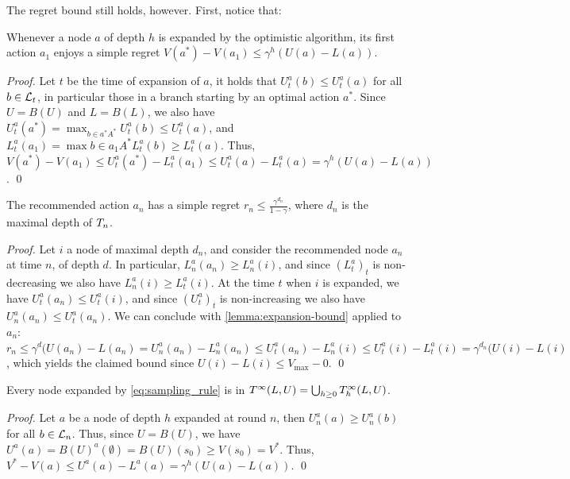 \documentclass[runningheads]{llncs}
\begin{document}
The regret bound still holds, however. First, notice that:
\begin{lemma}
\label{lemma:expansion-bound}
Whenever a node $a$ of depth $h$ is expanded by the optimistic algorithm, its first action $a_1$ enjoys a simple regret $V(a^*)-V(a_1) \leq \gamma^h(U(a)-L(a))$. 
\end{lemma}
\begin{proof}
Let $t$ be the time of expansion of $a$, it holds that $U^a_t(b) \leq U^a_t(a)$ for all $b\in \mathcal{L}_t$, in particular those in a branch starting by an optimal action $a^*$. Since $U=B(U)$ and $L=B(L)$, we also have $U^a_t(a^*) = \max_{b\in a^*A^*} U^a_t(b) \leq U^a_t(a)$, and $L^a_t(a_1) = \max{b\in a_1 A^*} L^a_t(b) \geq  L^a_t(a)$. Thus, $V(a^*)-V(a_1) \leq U^a_t(a^*) - L^a_t(a_1) \leq U^a_t(a) - L^a_t(a) = \gamma^h(U(a)-L(a))$.
\qed\end{proof}
 
\begin{lemma}
The recommended action $a_n$ has a simple regret $r_n \leq \frac{\gamma^{d_n}}{1-\gamma}$, where $d_n$ is the maximal depth of $T_n$.
\end{lemma}
\begin{proof}
Let $i$ a node of maximal depth $d_n$, and consider the recommended node $a_n$ at time $n$, of depth $d$. In particular, $L^a_n(a_n) \geq L^a_n(i)$, and since $(L^a_t)_t$ is non-decreasing we also have $L^a_n(i) \geq L^a_t(i)$. At the time $t$ when $i$ is expanded, we have $U^a_t(a_n) \leq U^a_t(i)$, and since $(U^a_t)_t$ is non-increasing we also have $U^a_n(a_n) \leq U^a_t(a_n)$. We can conclude with \autoref{lemma:expansion-bound} applied to $a_n$: $r_n \leq \gamma^d(U(a_n)-L(a_n) = U^a_n(a_n) - L^a_n(a_n)  \leq U^a_t(a_n) - L^a_n(i) \leq U^a_t(i) - L^a_t(i) = \gamma^{d_n}(U(i) - L(i)$, which yields the claimed bound since $U(i) - L(i) \leq V_{\max}-0$.
\qed\end{proof}

\begin{lemma}
\label{lemma:expansion-tree}
Every node expanded by \eqref{eq:sampling_rule} is in $T^\infty(L,U) = \bigcup_{h\geq 0} T^\infty_h(L,U)$.
\end{lemma}
\begin{proof}
Let $a$ be a node of depth $h$ expanded at round $n$, then $U^a_n(a) \geq U^a_n(b)$ for all $b\in\mathcal{L}_n$. Thus, since $U = B(U)$, we have $U^a(a) = B(U)^a(\emptyset) = B(U)(s_0) \geq V(s_0) = V^*$. Thus, $V^* - V(a) \leq U^a(a) - L^a(a) = \gamma^h(U(a) - L(a))$.
\qed\end{proof}
\end{document}
